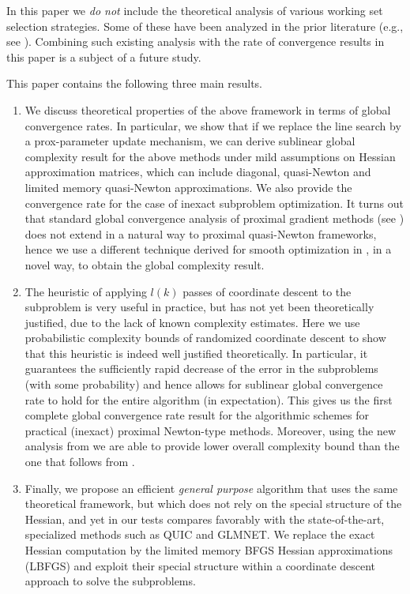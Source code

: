 \documentclass[11pt]{article}
\numberwithin{equation}{section}
\begin{document}
In this paper we {\em do not } include the theoretical analysis of various working set selection strategies. Some of these have been analyzed in the prior literature (e.g., see \cite{LewisWright11}). Combining such existing analysis with the rate of convergence results in this paper is a subject of a future study. 

This paper contains the following  three main results. 
\begin{enumerate}
\item We discuss   theoretical properties of the above framework in terms of global convergence rates.
In particular, we show that if we replace the line search by a prox-parameter update mechanism, we can derive sublinear global complexity result for the above methods under mild assumptions on Hessian approximation matrices, which can include diagonal, quasi-Newton and limited memory quasi-Newton approximations. We also provide the convergence rate for the case of inexact subproblem optimization. 
It turns out that standard global convergence analysis of proximal gradient methods (see \cite{Beck2009,Schmidtetal}) does not extend in a natural way to  proximal
quasi-Newton frameworks, hence we use a different technique derived for smooth optimization in \cite{Nesterov, NesterovPolyak, Cartisetal2012},  in a novel way, to obtain the global complexity result.  

\item The heuristic of applying $l(k)$ passes of coordinate descent to the subproblem is very useful in practice, but has not yet been theoretically justified, due to the lack of known complexity estimates. Here we use probabilistic complexity bounds of randomized coordinate descent to show that this heuristic is indeed  well justified theoretically.
In particular, it guarantees the sufficiently rapid decrease  of the error in the subproblems (with some probability) and hence allows for sublinear global convergence rate to hold for the entire algorithm (in expectation). This gives us the  first complete global convergence rate result for the algorithmic schemes for  practical (inexact) proximal Newton-type methods. Moreover, using the new analysis from \cite{NesterovConvexBook2004, NesterovPolyak, Cartisetal2012} we are able to provide lower overall complexity
bound than the one that follows from  \cite{Schmidtetal}.
\item
Finally, we propose an efficient {\em general purpose} algorithm that uses the same theoretical framework, but  which does not rely on the special structure of the Hessian, and yet in our tests compares favorably with the state-of-the-art, specialized methods such as   QUIC and GLMNET. We replace the exact Hessian computation by the limited memory BFGS Hessian approximations  \cite{NoceWrig06}  (LBFGS) and exploit their special structure within a coordinate descent approach to solve the subproblems.
\end{enumerate}
\end{document}
